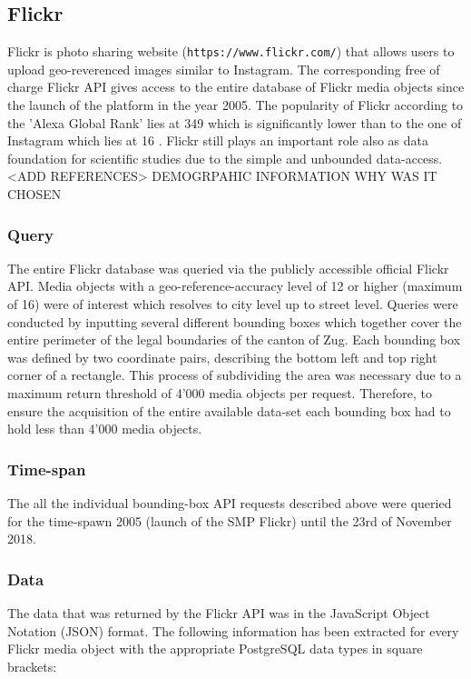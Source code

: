 \subsection{Flickr} \label{flickr}
Flickr is photo sharing website (\texttt{https://www.flickr.com/}) that allows users to upload geo-reverenced images similar to Instagram. The corresponding free of charge Flickr API gives access to the entire database of Flickr media objects since the launch of the platform in the year 2005. The popularity of Flickr according to the 'Alexa Global Rank' lies at 349 \cite{Alexa.com2019AlexaFlickr} which is significantly lower than to the one of Instagram which lies at 16 \cite{Alexa.com2019AlexaInstagram}. Flickr still plays an important role also as data foundation for scientific studies due to the simple and unbounded data-access. <ADD REFERENCES>
DEMOGRPAHIC INFORMATION
WHY WAS IT CHOSEN
\subsubsection{Query} \label{flickr_query}
The entire Flickr database was queried via the publicly accessible official Flickr API. Media objects with a geo-reference-accuracy level of 12 or higher (maximum of 16) were of interest which resolves to city level up to street level. Queries were conducted by inputting several different bounding boxes which together cover the entire perimeter of the legal boundaries of the canton of Zug. Each bounding box was defined by two coordinate pairs, describing the bottom left and top right corner of a rectangle. This process of subdividing the area was necessary due to a maximum return threshold of 4'000 media objects per request. Therefore, to ensure the acquisition of the entire available data-set each bounding box had to hold less than 4'000 media objects.
\subsubsection{Time-span} \label{flickr_timespan}
The all the individual bounding-box API requests described above were queried for the time-spawn 2005 (launch of the SMP Flickr) until the 23rd of November 2018. 
\subsubsection{Data} \label{flickr_data}
The data that was returned by the Flickr API was in the JavaScript Object Notation (JSON) format. The following information has been extracted for every Flickr media object with the appropriate PostgreSQL data types in square brackets:\\

